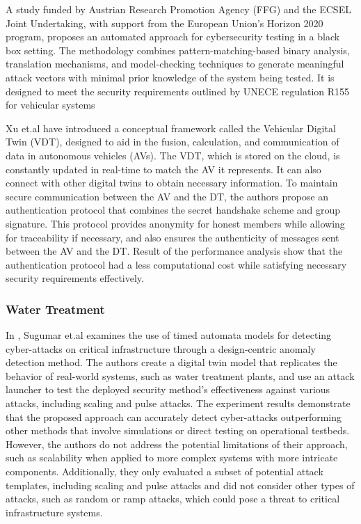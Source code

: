 A study\cite{marksteinerUsingCyberDigital2021} funded by Austrian Research Promotion Agency (FFG) and the ECSEL Joint Undertaking, with support from the European Union's Horizon 2020 program, proposes an automated approach for cybersecurity testing in a black box setting. The methodology combines pattern-matching-based binary analysis, translation mechanisms, and model-checking techniques to generate meaningful attack vectors with minimal prior knowledge of the system being tested. It is designed to meet the security requirements outlined by UNECE regulation R155 for vehicular systems  

Xu et.al\cite{xuEfficientAuthenticationVehicular2021} have introduced a conceptual framework called the Vehicular Digital Twin (VDT), designed to aid in the fusion, calculation, and communication of data in autonomous vehicles (AVs). The VDT, which is stored on the cloud, is constantly updated in real-time to match the AV it represents. It can also connect with other digital twins to obtain necessary information. To maintain secure communication between the AV and the DT, the authors propose an authentication protocol that combines the secret handshake scheme and group signature. This protocol provides anonymity for honest members while allowing for traceability if necessary, and also ensures the authenticity of messages sent between the AV and the DT. Result of the performance analysis show that the authentication protocol had a less computational cost while satisfying necessary security requirements effectively. 

\subsubsection{Water Treatment}
In \cite{sugumarAssessmentMethodDetecting2019}, Sugumar et.al examines the use of timed automata models for detecting cyber-attacks on critical infrastructure through a design-centric anomaly detection method. The authors create a digital twin model that replicates the behavior of real-world systems, such as water treatment plants, and use an attack launcher to test the deployed security method's effectiveness against various attacks, including scaling and pulse attacks. The experiment results demonstrate that the proposed approach can accurately detect cyber-attacks outperforming other methods that involve simulations or direct testing on operational testbeds. However, the authors do not address the potential limitations of their approach, such as scalability when applied to more complex systems with more intricate components. Additionally, they only evaluated a subset of potential attack templates, including scaling and pulse attacks and did not consider other types of attacks, such as random or ramp attacks, which could pose a threat to critical infrastructure systems. 

